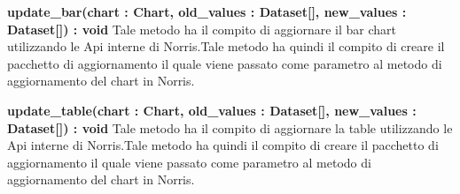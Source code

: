 \begin{description}
            \item \textbf{update\_bar(chart : Chart, old\_values : Dataset[], new\_values : Dataset[]) : void} Tale metodo ha il compito di aggiornare il bar chart utilizzando le Api interne di Norris.Tale metodo ha quindi il compito di creare il pacchetto di aggiornamento il quale viene passato come parametro al metodo di aggiornamento del chart in Norris.
            
            \item \textbf{update\_table(chart : Chart, old\_values : Dataset[], new\_values : Dataset[]) : void} Tale metodo ha il compito di aggiornare la table utilizzando le Api interne di Norris.Tale metodo ha quindi il compito di creare il pacchetto di aggiornamento il quale viene passato come parametro al metodo di aggiornamento del chart in Norris.
            
        \end{description}